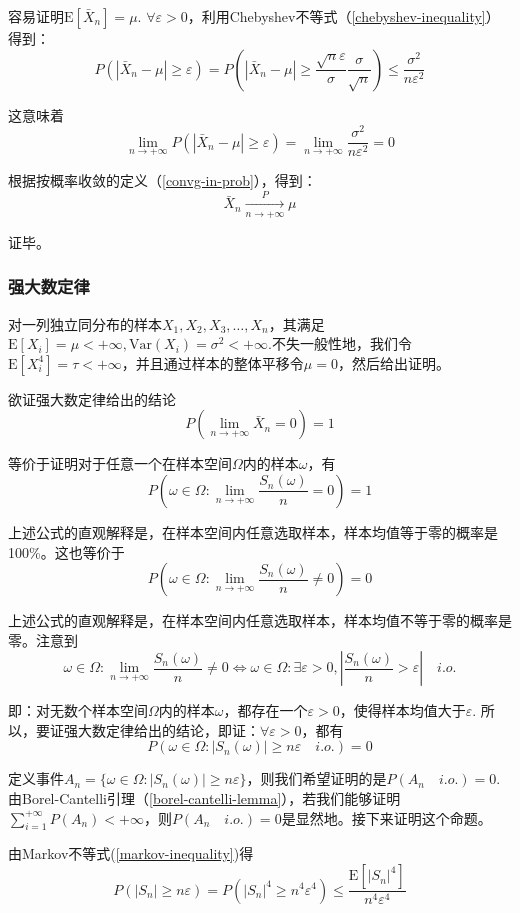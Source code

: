\documentclass[UTF8]{ctexbook}
\begin{document}
容易证明$\mathrm E[\bar{X}_n]=\mu$. $\forall\varepsilon>0$，利用Chebyshev不等式（\ref{chebyshev-inequality}）得到：
\[
	P(|\bar{X}_n-\mu|\geq\varepsilon)=P(|\bar{X}_n-\mu|\geq\frac{\sqrt{n}\varepsilon}{\sigma}\frac{\sigma}{\sqrt{n}})\leq\frac{\sigma^2}{n\varepsilon^2}
\]

这意味着
\[
	\lim_{n\to+\infty}P(|\bar{X}_n-\mu|\geq\varepsilon)=\lim_{n\to+\infty}\frac{\sigma^2}{n\varepsilon^2}=0
\]

根据按概率收敛的定义（\ref{convg-in-prob}），得到：
\[
	\bar{X}_n\xrightarrow[n\to+\infty]{P}\mu
\]

证毕。
\subsubsection{强大数定律}
\label{SLLN-proof}
对一列独立同分布的样本$X_1,X_2,X_3,\dots,X_n$，其满足$\mathrm E[X_i]=\mu<+\infty,\mathrm{Var}(X_i)=\sigma^2<+\infty$.不失一般性地，我们令$\mathrm E[X_i^4]=\tau<+\infty$，并且通过样本的整体平移令$\mu=0$，然后给出证明。

欲证强大数定律给出的结论
\[
	P\left(\lim_{n\to+\infty}\bar{X}_n=0\right)=1
\]

等价于证明对于任意一个在样本空间$\Omega$内的样本$\omega$，有
\[
	P\left(\omega\in\Omega:\lim_{n\to+\infty}\frac{S_n(\omega)}{n}=0\right)=1
\]

上述公式的直观解释是，在样本空间内任意选取样本，样本均值等于零的概率是100\%。这也等价于
\[
	P\left(\omega\in\Omega:\lim_{n\to+\infty}\frac{S_n(\omega)}{n}\neq0\right)=0
\]

上述公式的直观解释是，在样本空间内任意选取样本，样本均值不等于零的概率是零。注意到
\[
	\omega\in\Omega:\lim_{n\to+\infty}\frac{S_n(\omega)}{n}\neq0\Longleftrightarrow\omega\in\Omega:\exists\varepsilon>0,\left|\frac{S_n(\omega)}{n}>\varepsilon\right|\quad i.o.
\]

即：对无数个样本空间$\Omega$内的样本$\omega$，都存在一个$\varepsilon>0$，使得样本均值大于$\varepsilon$. 所以，要证强大数定律给出的结论，即证：$\forall\varepsilon>0$，都有
\[
	P\left(\omega\in\Omega:|S_n(\omega)|\geq n\varepsilon\quad i.o.\right)=0
\]

定义事件$A_n=\{\omega\in\Omega:|S_n(\omega)|\geq n\varepsilon\}$，则我们希望证明的是$P(A_n\quad i.o.)=0$.由Borel-Cantelli引理（\ref{borel-cantelli-lemma}），若我们能够证明$\sum_{i=1}^{+\infty}P(A_n)<+\infty$，则$P(A_n\quad i.o.)=0$是显然地。接下来证明这个命题。

由Markov不等式(\ref{markov-inequality})得
\[
	P\left(|S_n|\geq n\varepsilon\right)=P\left(|S_n|^4\geq n^4\varepsilon^4\right)\leq\frac{\mathrm E[|S_n|^4]}{n^4\varepsilon^4}
\]
\end{document}
